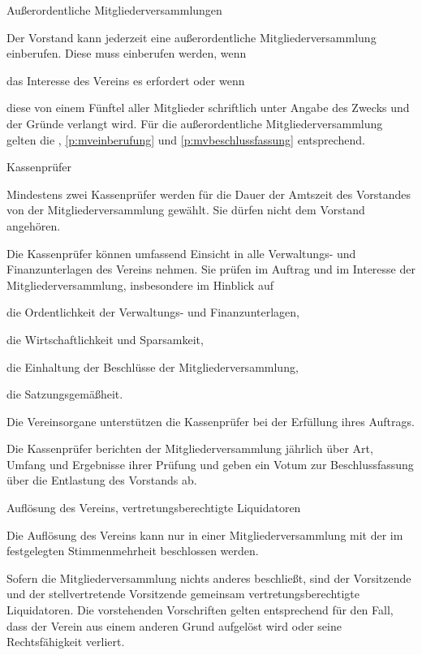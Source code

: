 \documentclass[11pt,a4paper,twoside,openany,article]{memoir}
\begin{document}
\begin{para}{Außerordentliche Mitgliederversammlungen}
  \label{p:mvaußerordentlich}
  \item Der Vorstand kann jederzeit eine außerordentliche Mitgliederversammlung einberufen. Diese muss einberufen werden, wenn
  \begin{subpara}
    \item das Interesse des Vereins es erfordert oder wenn
    \item diese von einem Fünftel aller Mitglieder schriftlich unter Angabe des Zwecks und der Gründe verlangt wird.
    Für die außerordentliche Mitgliederversammlung gelten die , \ref{p:mveinberufung} und \ref{p:mvbeschlussfassung} entsprechend.
  \end{subpara}
\end{para}

\begin{para}{Kassenprüfer}
  \label{p:kassenprüfer}
  \item Mindestens zwei Kassenprüfer werden für die Dauer der Amtszeit des Vorstandes von der Mitgliederversammlung gewählt. Sie dürfen nicht dem Vorstand angehören.
  \item Die Kassenprüfer können umfassend Einsicht in alle Verwaltungs- und Finanzunterlagen des Vereins nehmen. Sie prüfen im Auftrag und im Interesse der Mitgliederversammlung, insbesondere im Hinblick auf
  \begin{subpara}
    \item die Ordentlichkeit der Verwaltungs- und Finanzunterlagen,
    \item die Wirtschaftlichkeit und Sparsamkeit,
    \item die Einhaltung der Beschlüsse der Mitgliederversammlung,
    \item die Satzungsgemäßheit.
  \end{subpara}
  \item Die Vereinsorgane unterstützen die Kassenprüfer bei der Erfüllung ihres Auftrags.
  \item Die Kassenprüfer berichten der Mitgliederversammlung jährlich über Art, Umfang und Ergebnisse ihrer Prüfung und geben ein Votum zur Beschlussfassung über die Entlastung des Vorstands ab.
\end{para}

\begin{para}{Auflösung des Vereins, vertretungsberechtigte Liquidatoren}
  \label{p:auflösung}
  \item Die Auflösung des Vereins kann nur in einer Mitgliederversammlung mit der im  festgelegten Stimmenmehrheit beschlossen werden.
  \item Sofern die Mitgliederversammlung nichts anderes beschließt, sind der Vorsitzende und der stellvertretende Vorsitzende gemeinsam vertretungs\-be\-rech\-tigte Liquidatoren.
  Die vorstehenden Vorschriften gelten entsprechend für den Fall, dass der Verein aus einem anderen Grund aufgelöst wird oder seine Rechtsfähigkeit verliert.
\end{para}
\end{document}
